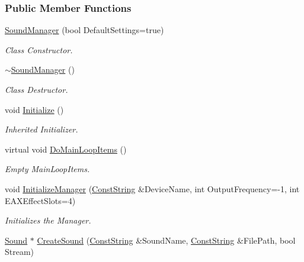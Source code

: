 \subsubsection*{Public Member Functions}
\begin{DoxyCompactItemize}
\item 
\hyperlink{classphys_1_1SoundManager_a42d41090652f8ef12d575d78881d6a05}{SoundManager} (bool DefaultSettings=true)
\begin{DoxyCompactList}\small\item\em Class Constructor. \item\end{DoxyCompactList}\item 
\hyperlink{classphys_1_1SoundManager_af557110e5f0eccc7be861f163e1670d0}{$\sim$SoundManager} ()
\begin{DoxyCompactList}\small\item\em Class Destructor. \item\end{DoxyCompactList}\item 
void \hyperlink{classphys_1_1SoundManager_ae6d3957f965b54e06ec540e903cec68d}{Initialize} ()
\begin{DoxyCompactList}\small\item\em Inherited Initializer. \item\end{DoxyCompactList}\item 
virtual void \hyperlink{classphys_1_1SoundManager_a577b228753ea19856b8476ab831e547e}{DoMainLoopItems} ()
\begin{DoxyCompactList}\small\item\em Empty MainLoopItems. \item\end{DoxyCompactList}\item 
void \hyperlink{classphys_1_1SoundManager_a735ca3ad1554d70623ac60f38ca4cefc}{InitializeManager} (\hyperlink{namespacephys_a5ce5049f8b4bf88d6413c47b504ebb31}{ConstString} \&DeviceName, int OutputFrequency=-\/1, int EAXEffectSlots=4)
\begin{DoxyCompactList}\small\item\em Initializes the Manager. \item\end{DoxyCompactList}\item 
\hyperlink{classphys_1_1Sound}{Sound} $\ast$ \hyperlink{classphys_1_1SoundManager_a4504934e7a6a75045f0a8d303b7be0b8}{CreateSound} (\hyperlink{namespacephys_a5ce5049f8b4bf88d6413c47b504ebb31}{ConstString} \&SoundName, \hyperlink{namespacephys_a5ce5049f8b4bf88d6413c47b504ebb31}{ConstString} \&FilePath, bool Stream)

\end{DoxyCompactItemize}
